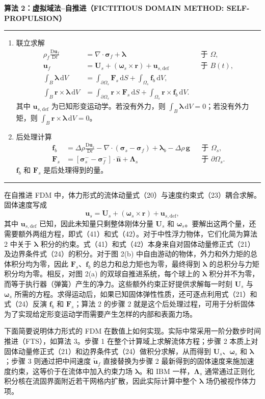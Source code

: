 \documentclass[UTF8,11pt,a4paper]{ctexart}
\newcommand{\dd}{\,\mathrm{d}}
\newcommand{\D}{\mathrm{D}}
\newenvironment{algbox}[1]{%
  \par\medskip\noindent\textbf{#1}\par\smallskip\hrule\smallskip
  \begin{enumerate}[leftmargin=2.2em,label=\arabic*.]\small
}{%
  \end{enumerate}\smallskip\hrule\par\medskip
}
\begin{document}
\begin{algbox}{算法 2：虚拟域法--自推进（FICTITIOUS DOMAIN METHOD: SELF-PROPULSION）}
\item 联立求解
\begin{align*}
\rho_f\frac{\D\bm u_f}{\D t}&=\nabla\cdot\bm\sigma_f+\bm\lambda &&\text{于 }\Omega,\\
\bm u_f&=\bm U_s+(\bm\omega_s\times\bm r)+\bm u_{s,\mathrm{def}} &&\text{于 }B(t),\\
\int_B\bm\lambda\dd V&=\int_{\partial\Omega_s}\bm F_s\dd S+\int_{\Omega_s}\bm f_b\dd V,\\
\int_B\bm r\times\bm\lambda\dd V&=\int_{\partial\Omega_s}\bm r\times\bm F_s\dd S+\int_{\Omega_s}\bm r\times\bm f_b\dd V.
\end{align*}
其中 $\bm u_{s,\mathrm{def}}$ 为已知形变运动学。若没有外力，则 $\int_B\bm\lambda\dd V=0$；若没有外力矩，则 $\int_B\bm r\times\bm\lambda\dd V=0$。
\item 后处理计算
\begin{align*}
\bm f_b&=\Delta\rho\frac{\D\bm u_s}{\D t}-\nabla\cdot(\bm\sigma_s-\bm\sigma_f)+\bm\lambda_b-\Delta\rho\,\bm g &&\text{于 }\Omega_s,\\
\bm F_s&=\left[\bm\sigma_s^{-}-\bm\sigma_f^{-}\right]\cdot\hat{\bm n}+\bm\Lambda_s &&\text{于 }\partial\Omega_s.
\end{align*}
$\bm f_b$ 和 $\bm F_s$ 是后处理得到的量。
\end{algbox}

在自推进 FDM 中，体力形式的流体动量式（20）与速度约束式（23）耦合求解。固体速度写成
\[
\bm u_s=\bm U_s+(\bm\omega_s\times\bm r)+\bm u_{s,\mathrm{def}},
\]
其中 $\bm u_{s,\mathrm{def}}$ 已知，因此未知量只剩整体刚体分量 $\bm U_s$ 和 $\bm\omega_s$。要解出这两个量，还需要额外两组方程，即式（41）和式（42）。对于中性浮力物体，它们化简为算法 2 中关于 $\bm\lambda$ 积分的约束。式（41）和式（42）本身来自对固体动量修正式（21）及边界条件式（24）的积分。对于图 2(b) 中自由游动的物体，外力和外力矩的总体积分均为零，因此 $\bm F_s$、$\bm f_b$ 的总力和总力矩也为零，最终得到 $\bm\lambda$ 的总积分与力矩积分均为零。相反，对图 2(a) 的双球自推进系统，每个球上的 $\bm\lambda$ 积分并不为零，而等于执行器（弹簧）产生的净力。这些额外约束正好提供求解每一时刻 $\bm U_s$ 与 $\bm\omega_s$ 所需的方程。求得运动后，如果已知固体弹性性质，还可逐点利用式（21）和式（24）反演 $\bm f_b$ 和 $\bm F_s$；算法 2 的步骤 2 就是这个后处理过程，可用于分析固体为了实现给定形变运动学而需要产生怎样的内部和表面力场。

下面简要说明体力形式的 FDM 在数值上如何实现。实际中常采用一阶分数步时间推进（FTS），如算法 3。步骤 1 在整个计算域上求解流体方程；步骤 2 本质上对固体动量修正式（21）和边界条件式（24）做积分求解，从而得到 $\bm U_s$、$\bm\omega_s$ 和 $\bm\lambda$；步骤 3 则通过把中间速度 $\tilde{\bm u}_f$ 直接替换为步骤 2 最新得到的固体速度来施加速度约束，这等价于在流体中加入约束力场 $\bm\lambda$。和 IBM 一样，$\bm\Lambda_s$ 通常通过正则化积分核在流固界面附近若干网格内扩散，因此实际计算中整个 $\bm\lambda$ 场仍被视作体力项。
\end{document}
